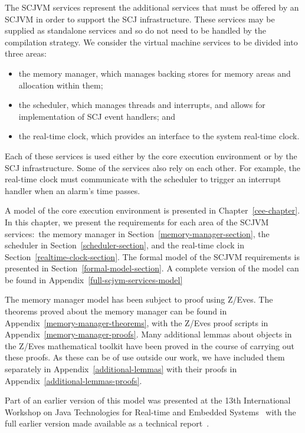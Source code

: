 The SCJVM services represent the additional services that must be
offered by an SCJVM in order to support the SCJ infrastructure.
These services may be supplied as standalone services and so do not
need to be handled by the compilation strategy.
We consider the virtual machine services to be divided into three
areas:
\begin{itemize}
\item the memory manager, which manages backing stores for memory areas and
  allocation within them;
\item the scheduler, which manages threads and interrupts, and allows for
  implementation of SCJ event handlers; and
\item the real-time clock, which provides an interface to the system real-time
  clock.
\end{itemize}
Each of these services is used either by the core execution
environment or by the SCJ infrastructure.
Some of the services also rely on each other. 
For example, the real-time clock must communicate with the scheduler
to trigger an interrupt handler when an alarm's time passes.

A model of the core execution environment is presented in
Chapter~\ref{cee-chapter}.
In this chapter, we present the requirements for each area of the
SCJVM services:~the memory manager in
Section~\ref{memory-manager-section}, the scheduler in
Section~\ref{scheduler-section}, and the real-time clock in
Section~\ref{realtime-clock-section}.
The formal model of the SCJVM requirements is presented in
Section~\ref{formal-model-section}.
A complete version of the model can be found in
Appendix~\ref{full-scjvm-services-model}

The memory manager model has been subject to proof using Z/Eves.
The theorems proved about the memory manager can be found in
Appendix~\ref{memory-manager-theorems}, with the Z/Eves proof scripts
in Appendix~\ref{memory-manager-proofs}.
Many additional lemmas about objects in the Z/Eves mathematical
toolkit have been proved in the course of carrying out these proofs.
As these can be of use outside our work, we have included them
separately in Appendix~\ref{additional-lemmas} with their proofs in
Appendix~\ref{additional-lemmas-proofs}.


Part of an earlier version of this model was presented at the 13th
International Workshop on Java Technologies for Real-time and Embedded
Systems~\cite{baxter2015a} with the full earlier version made available
as a technical report~\cite{baxter2015}.

